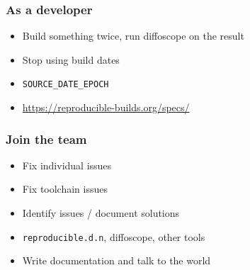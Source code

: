 \documentclass[14pt,aspectratio=169]{beamer}
\begin{document}
\begin{frame}
 \frametitle{As a developer} \pause
 \begin{itemize}
  \item Build something twice, run diffoscope on the result \pause
  \item Stop using build dates \pause
  \item \texttt{SOURCE\_DATE\_EPOCH}
  \item \url{https://reproducible-builds.org/specs/}
 \end{itemize}
\end{frame}

\begin{frame}
 \frametitle{Join the team} \pause

 \begin{itemize}
   \item Fix individual issues \pause
   \item Fix toolchain issues \pause
   \item Identify issues / document solutions \pause
   \item \texttt{reproducible.d.n}, diffoscope, other tools \pause
   \item Write documentation and talk to the world
 \end{itemize}
\end{frame}

\end{document}
